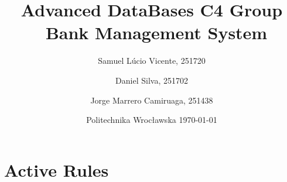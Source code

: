 \documentclass[a4paper, 10pt]{article}
\begin{document}
\title{Advanced DataBases C4 Group\\\
  \huge Bank Management System}
\author{
  Samuel Lúcio Vicente, 251720
  \and
  Daniel Silva, 251702
  \and
  Jorge Marrero Camiruaga, 251438
}

\date{Politechnika Wrocławska \today}

\maketitle


\section{Active Rules}
\end{document}
